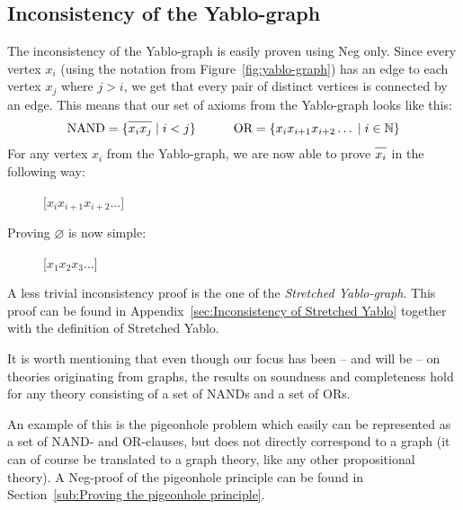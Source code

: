 \subsection{Inconsistency of the Yablo-graph}
\label{sub:Inconsistency of the Yablo-graph}
The inconsistency of the Yablo-graph is easily proven using Neg only.
Since every vertex $x_i$ (using the notation from Figure~\ref{fig:yablo-graph}) has an edge to each vertex $x_j$ where $j > i$, we get that every pair of distinct vertices is connected by an edge.
This means that our set of axioms from the Yablo-graph looks like this:
\begin{align}
  \text{NAND} = \{ \ol{x_ix_j} \; |\; i < j\}
  \quad\quad\quad
  \text{OR} = \{ x_ix_{i+1}x_{i+2}\dots \; |\; i \in \mathbb{N}\}
\end{align}
For any vertex $x_i$ from the Yablo-graph, we are now able to prove $\ol{x_i}$ in the following way:\par
\begin{figure}[!h]
  \centering
  \begin{prooftree*}
    \Hypo{\dots}
    [$x_ix_{i+1}x_{i+2}\dots$]{}
  \end{prooftree*}
  \caption{}
  \label{fig:proof_xi}
\end{figure}
Proving $\varnothing$ is now simple:\par
\begin{figure}[!h]
  \centering
  \begin{prooftree*}
    \Hypo{\dots}
    \Hypo{\dots}
    \Hypo{\dots}
    \Hypo{\dots}
    [$x_1x_2x_3\dots$]{\varnothing}
  \end{prooftree*}
  \caption{}
  \label{fig:proof_yablo}
\end{figure}
A less trivial inconsistency proof is the one of the \textit{Stretched Yablo-graph}.
This proof can be found in Appendix~\ref{sec:Inconsistency of Stretched Yablo} together with the definition of Stretched Yablo.

It is worth mentioning that even though our focus has been -- and will be -- on theories originating from graphs, the results on soundness and completeness hold for any theory consisting of a set of NANDs and a set of ORs.

An example of this is the pigeonhole problem which easily can be represented as a set of NAND- and OR-clauses, but does not directly correspond to a graph (it can of course be translated to a graph theory, like any other propositional theory).
A Neg-proof of the pigeonhole principle can be found in Section~\ref{sub:Proving the pigeonhole principle}.
